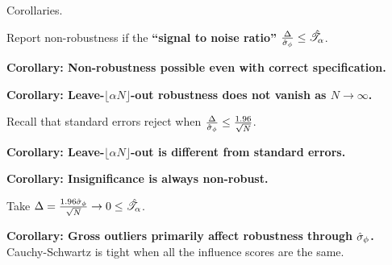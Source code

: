 
\begin{frame}{Corollaries.}


\pause
Report non-robustness if the \textbf{``signal to noise ratio''}
$\frac{\Delta}{\hat\sigma_{\phi}} \le \hat{\mathscr{T}}_\alpha$.

\hrulefill


\pause
\vspace{0.5em}
\textbf{Corollary:  Non-robustness possible even with correct specification.}

\pause
\vspace{0.5em}
\textbf{Corollary:  Leave-$\lfloor \alpha N \rfloor$-out robustness does not vanish as $N \rightarrow \infty$.}
%

\pause
\vspace{0.5em}
Recall that standard errors reject when
$\frac{\Delta}{\hat\sigma_{\phi}} \le \frac{1.96}{\sqrt{N}}$.

\pause
\vspace{0.5em}
\textbf{Corollary:  Leave-$\lfloor \alpha N \rfloor$-out is different from standard errors.}

\pause
\vspace{0.5em}
\textbf{Corollary:  Insignificance is always non-robust.}

Take $\Delta = \frac{1.96 \hat \sigma_\phi}{\sqrt{N}} \rightarrow 0 \le
\hat{\mathscr{T}}_\alpha$.

\pause
\vspace{0.5em}
\textbf{Corollary:  Gross outliers primarily affect robustness
through $\hat\sigma_{\phi}$.}
Cauchy-Schwartz is tight when all the influence scores are the same.

\end{frame}
